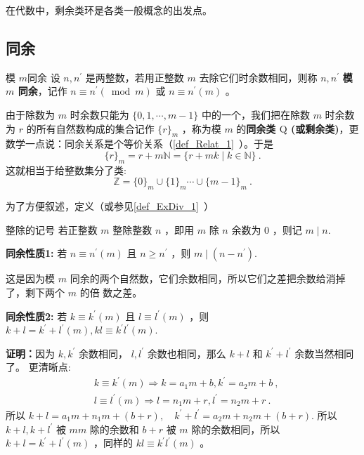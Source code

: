
在代数中，剩余类环是各类一般概念的出发点。
\subsection{同余}
\begin{definition}{模 $m$同余}\label{def_RRing_1}
设 $n, n^{\prime}$ 是两整数，若用正整数 $m$ 去除它们时余数相同，则称 $n, n^{\prime}$ \textbf{模 $m$ 同余}，记作 $n \equiv n^{\prime}(\bmod m)$ 或 $n \equiv n^{\prime}(m)$ 。 
\end{definition} 
由于除数为 $m$ 时余数只能为 $\{0,1, \cdots, m-1\}$ 中的一个，我们把在除数 $m$ 时余数为 $r$ 的所有自然数构成的集合记作 $\{r\}_m$ ，称为模 $m$ 的\textbf{同余类 $\mathrm{Q}$ (或剩余类)}，更数学一点说：同余关系是个等价关系（\autoref{def_Relat_1}~）。于是
\begin{equation}
\{r\}_m=r+m \mathbb{N}=\{r+m k \mid k \in \mathbb{N}\}~.
\end{equation}
这就相当于给整数集分了类:
\begin{equation}
\mathbb{Z}=\{0\}_m \cup\{1\}_m \cdots \cup\{m-1\}_m~.
\end{equation}

为了方便叙述，定义（或参见\autoref{def_ExDiv_1}~）
\begin{definition}{整除的记号}
若正整数 $m$ 整除整数 $n$ ，即用 $m$ 除 $n$ 余数为 0 ，则记 $m \mid n$.
\end{definition}
\textbf{同余性质1:} 若 $n \equiv n^{\prime}(m)$ 且 $n \geq n^{\prime}$ ，则 $m \mid\left(n-n^{\prime}\right)$.

这是因为模 $m$ 同余的两个自然数，它们余数相同，所以它们之差把余数给消掉了，剩下两个 $m$ 的倍 数之差。

\textbf{同余性质2:} 若 $k \equiv k^{\prime}(m)$ 且 $l \equiv l^{\prime}(m)$ ，则 $k+l=k^{\prime}+l^{\prime}(m), k l \equiv k^{\prime} l^{\prime}(m)$.

\textbf{证明：}因为 $k, k^{\prime}$ 余数相同， $l, l^{\prime}$ 余数也相同，那么 $k+l$ 和 $k^{\prime}+l^{\prime}$ 余数当然相同了。
更清晰点:
\begin{equation}
\begin{aligned}
& k \equiv k^{\prime}(m) \Rightarrow k=a_1 m+b, k^{\prime}=a_2 m+b~, \\
& l \equiv l^{\prime}(m) \Rightarrow l=n_1 m+r, l^{\prime}=n_2 m+r~.
\end{aligned}
\end{equation}
所以 $k+l=a_1 m+n_1 m+(b+r), \quad k^{\prime}+l^{\prime}=a_2 m+n_2 m+(b+r).$
所以 $k+l, k+l^{\prime}$ 被 $m m$ 除的余数和 $b+r$ 被 $m$ 除的余数相同，所以 $k+l=k^{\prime}+l^{\prime}(m)$
，同样的 $k l \equiv k^{\prime} l^{\prime}(m)$ 。


